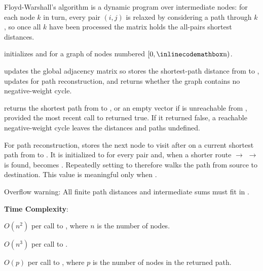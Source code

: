 Floyd-Warshall's algorithm is a dynamic program over intermediate nodes: for each node $k$ in turn, every pair $(i, j)$ is relaxed by considering a path through $k$, so once all $k$ have been processed the matrix holds the all-pairs shortest distances.

\begin{compactitem}
  \item {} initializes  and  for a graph of  nodes numbered $[0, {\inlinecodemath{n}})$.
  \item {} updates the global adjacency matrix  so  stores the shortest-path distance from  to , updates  for path reconstruction, and returns whether the graph contains no negative-weight cycle.
  \item {} returns the shortest path from  to , or an empty vector if  is unreachable from , provided the most recent call to  returned true. If it returned false, a reachable negative-weight cycle leaves the distances and paths undefined.
\end{compactitem}

For path reconstruction,  stores the next node to visit after  on a current shortest path from  to . It is initialized to  for every pair and, when a shorter route  $\to$  $\to$  is found, becomes . Repeatedly setting  to  therefore walks the path from source to destination. This value is meaningful only when .

Overflow warning: All finite path distances and intermediate sums must fit in .

\textbf{Time Complexity}:
\begin{compactitem}
  \item $O(n^{2})$ per call to , where $n$ is the number of nodes.
  \item $O(n^{3})$ per call to .
  \item $O(p)$ per call to , where $p$ is the number of nodes in the returned path.
\end{compactitem}

